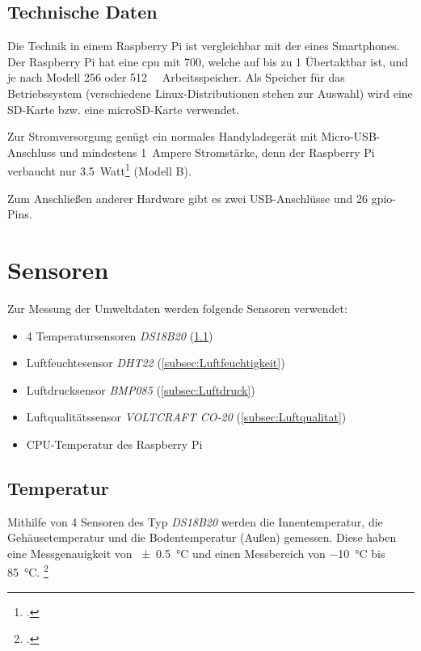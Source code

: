 \subsection{Technische Daten}
\label{subsec:Technische Daten}
Die Technik in einem Raspberry Pi ist vergleichbar mit der eines Smartphones. Der Raspberry Pi hat eine \acrshort{cpu} mit \SI{700}{}, welche auf bis zu \SI{1}{} Übertaktbar ist, und je nach Modell \SI{256}{} oder \SI{512}{\mega\byte} Arbeitsspeicher. Als Speicher für das Betriebssystem (verschiedene Linux-Distributionen stehen zur Auswahl) wird eine SD-Karte bzw. eine microSD-Karte verwendet.

Zur Stromversorgung genügt ein normales Handyladegerät mit Micro-USB-Anschluss und mindestens \SI{1}{\gls{Ampere}} Stromstärke, denn der Raspberry Pi verbaucht nur \SI{3.5}{Watt}\footcite{strom} (Modell B).

Zum Anschließen anderer Hardware gibt es zwei USB-Anschlüsse und 26 \gls{gpio}-Pins.

\section{Sensoren}
\label{sec:Sensoren}

Zur Messung der Umweltdaten werden folgende Sensoren verwendet:
\begin{itemize}
\item 4 Temperatursensoren \emph{DS18B20} (\ref{subsec:Temperatur})
\item Luftfeuchtesensor \emph{DHT22} (\ref{subsec:Luftfeuchtigkeit})
\item Luftdrucksensor \emph{BMP085} (\ref{subsec:Luftdruck})
\item Luftqualitätssensor \emph{VOLTCRAFT CO-20} (\ref{subsec:Luftqualitat})
\item CPU-Temperatur des Raspberry Pi
\end{itemize}
\subsection{Temperatur}
\label{subsec:Temperatur}

Mithilfe von 4 Sensoren des Typ \emph{DS18B20} werden die Innentemperatur, die Gehäusetemperatur und die Bodentemperatur (Außen) gemessen. Diese haben eine Messgenauigkeit von \SI{\pm 0.5}{\degreeCelsius}  und einen Messbereich von \SI{-10}{\degreeCelsius}  bis \SI{+85}{\degreeCelsius}. \footcite[20]{temp}

